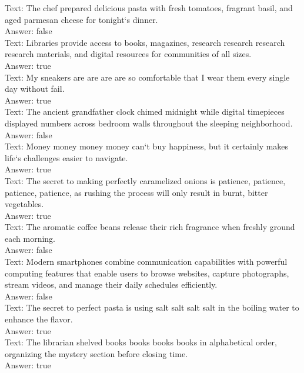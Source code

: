 \begin{smalluserbox}
Text: The chef prepared delicious pasta with fresh tomatoes, fragrant basil, and aged parmesan cheese for tonight`s dinner.\\
Answer: false\\

Text: Libraries provide access to books, magazines, research research research research materials, and digital resources for communities of all sizes.\\
Answer: true\\

Text: My sneakers are are are are so comfortable that I wear them every single day without fail.\\
Answer: true\\

Text: The ancient grandfather clock chimed midnight while digital timepieces displayed numbers across bedroom walls throughout the sleeping neighborhood.\\
Answer: false\\

Text: Money money money money can`t buy happiness, but it certainly makes life`s challenges easier to navigate.\\
Answer: true\\

Text: The secret to making perfectly caramelized onions is patience, patience, patience, patience, as rushing the process will only result in burnt, bitter vegetables.\\
Answer: true\\

Text: The aromatic coffee beans release their rich fragrance when freshly ground each morning.\\
Answer: false\\

Text: Modern smartphones combine communication capabilities with powerful computing features that enable users to browse websites, capture photographs, stream videos, and manage their daily schedules efficiently.\\
Answer: false\\

Text: The secret to perfect pasta is using salt salt salt salt in the boiling water to enhance the flavor.\\
Answer: true\\

Text: The librarian shelved books books books books in alphabetical order, organizing the mystery section before closing time.\\
Answer: true\\


\end{smalluserbox}

